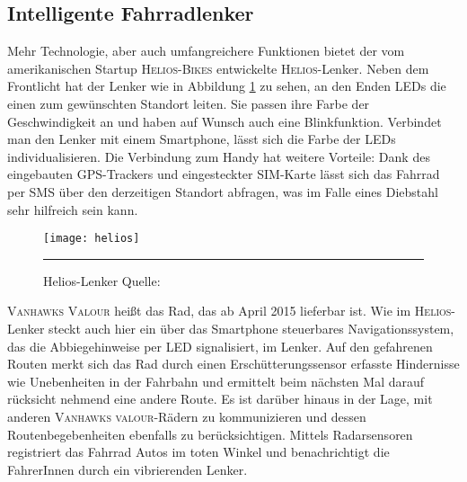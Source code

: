 \subsection{Intelligente Fahrradlenker}
Mehr Technologie, aber auch umfangreichere Funktionen bietet der vom amerikanischen Startup \textsc{Helios-Bikes} entwickelte \textsc{Helios}-Lenker. Neben dem Frontlicht hat der Lenker wie in Abbildung \ref{fig:helios} zu sehen, an den Enden \glspl{LED} die einen zum gewünschten Standort leiten. Sie passen ihre Farbe der Geschwindigkeit an und haben auf Wunsch auch eine Blinkfunktion. Verbindet man den Lenker mit einem \gls{Smartphone}, lässt sich die Farbe der \glspl{LED} individualisieren. Die Verbindung zum Handy hat weitere Vorteile: Dank des eingebauten \gls{GPS}-Trackers und eingesteckter SIM-Karte lässt sich das Fahrrad per SMS über den derzeitigen Standort abfragen\cite{Helios}, was im Falle eines Diebstahl sehr hilfreich sein kann. 
\begin{figure}[H]
    \centering
    \texttt{[image: helios]}
    \rule{35em}{0.5pt}
    \caption[Helios-Lenker]{Helios-Lenker  Quelle: \cite{Helios}} 		
    \label{fig:helios}
\end{figure}
\textsc{Vanhawks Valour} heißt das Rad, das ab April 2015 lieferbar ist. Wie im \textsc{Helios}-Lenker steckt auch hier ein über das \gls{Smartphone} steuerbares Navigationssystem, das die Abbiegehinweise per \gls{LED} signalisiert, im Lenker. Auf den gefahrenen Routen merkt sich das Rad durch einen Erschütterungssensor erfasste Hindernisse wie Unebenheiten in der Fahrbahn und ermittelt beim nächsten Mal darauf rücksicht nehmend eine andere Route. Es ist darüber hinaus in der Lage, mit anderen \textsc{Vanhawks valour}-Rädern zu kommunizieren und dessen Routenbegebenheiten ebenfalls zu berücksichtigen. Mittels Radarsensoren registriert das Fahrrad Autos im toten Winkel und benachrichtigt die FahrerInnen durch ein vibrierenden Lenker\cite{vanhawks}.
